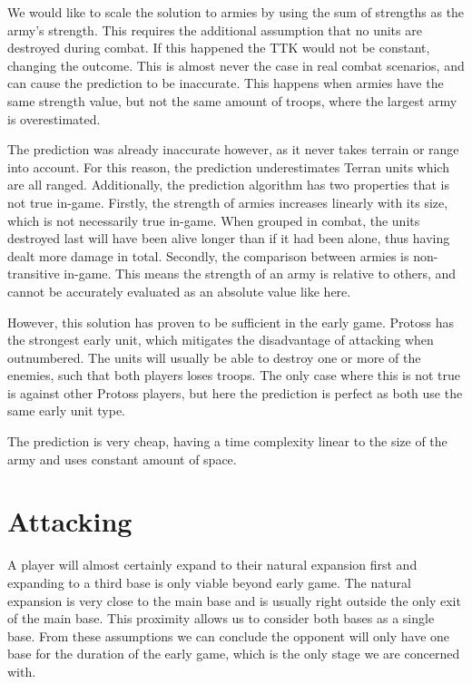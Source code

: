 We would like to scale the solution to armies by using the sum of strengths as the army's strength. This requires the additional assumption that no units are destroyed during combat. If this happened the TTK would not be constant, changing the outcome. This is almost never the case in real combat scenarios, and can cause the prediction to be inaccurate. This happens when armies have the same strength value, but not the same amount of troops, where the largest army is overestimated.

The prediction was already inaccurate however, as it never takes terrain or range into account. For this reason, the prediction underestimates Terran units which are all ranged. Additionally, the prediction algorithm has two properties that is not true in-game. Firstly, the strength of armies increases linearly with its size, which is not necessarily true in-game. When grouped in combat, the units destroyed last will have been alive longer than if it had been alone, thus having dealt more damage in total. Secondly, the comparison between armies is non-transitive in-game. This means the strength of an army is relative to others, and cannot be accurately evaluated as an absolute value like here.

However, this solution has proven to be sufficient in the early game. Protoss has the strongest early unit, which mitigates the disadvantage of attacking when outnumbered. The units will usually be able to destroy one or more of the enemies, such that both players loses troops. The only case where this is not true is against other Protoss players, but here the prediction is perfect as both use the same early unit type.

The prediction is very cheap, having a time complexity linear to the size of the army and uses constant amount of space.

\section{Attacking}
\label{sec:attacking}
A player will almost certainly expand to their natural expansion first and expanding to a third base is only viable beyond early game. The natural expansion is very close to the main base and is usually right outside the only exit of the main base. This proximity allows us to consider both bases as a single base. From these assumptions we can conclude the opponent will only have one base for the duration of the early game, which is the only stage we are concerned with.

